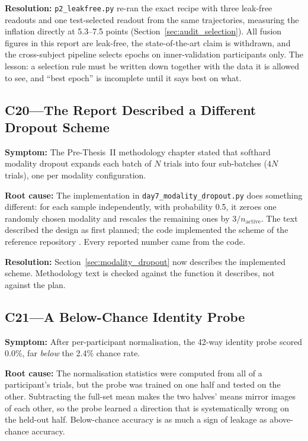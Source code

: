 \textbf{Resolution:} \texttt{p2\_leakfree.py} re-ran the exact recipe with three leak-free
readouts and one test-selected readout from the same trajectories, measuring the
inflation directly at 5.3--7.5 points (Section~\ref{sec:audit_selection}). All fusion
figures in this report are leak-free, the state-of-the-art claim is withdrawn, and the
cross-subject pipeline selects epochs on inner-validation participants only. The
lesson: a selection rule must be written down together with the data it is allowed to
see, and ``best epoch'' is incomplete until it says best on what.

\subsection*{C20---The Report Described a Different Dropout Scheme}

\textbf{Symptom:} The Pre-Thesis~II methodology chapter stated that softhard modality
dropout expands each batch of $N$ trials into four sub-batches ($4N$ trials), one per
modality configuration.

\textbf{Root cause:} The implementation in \texttt{day7\_modality\_dropout.py} does
something different: for each sample independently, with probability 0.5, it zeroes
one randomly chosen modality and rescales the remaining ones by $3/n_{\mathrm{active}}$.
The text described the design as first planned; the code implemented the scheme of
the reference repository \cite{Chumachenko2022SelfAttention}. Every reported number
came from the code.

\textbf{Resolution:} Section~\ref{sec:modality_dropout} now describes the implemented
scheme. Methodology text is checked against the function it describes, not against the
plan.

\subsection*{C21---A Below-Chance Identity Probe}

\textbf{Symptom:} After per-participant normalisation, the 42-way identity probe scored
0.0\%, far \emph{below} the 2.4\% chance rate.

\textbf{Root cause:} The normalisation statistics were computed from all of a
participant's trials, but the probe was trained on one half and tested on the other.
Subtracting the full-set mean makes the two halves' means mirror images of each other,
so the probe learned a direction that is systematically wrong on the held-out half.
Below-chance accuracy is as much a sign of leakage as above-chance accuracy.

